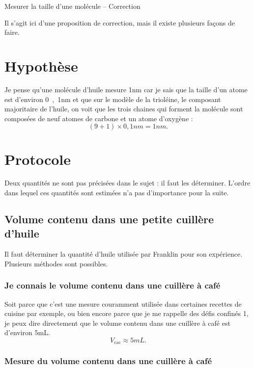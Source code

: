 \documentclass[12pt,a4paper]{article}
\begin{document}
\begin{header}
Mesurer la taille d'une molécule -- Correction
\end{header}

Il s'agit ici d'une proposition de correction, mais il existe plusieurs façons de faire.

\section{Hypothèse}

Je pense qu'une molécule d'huile mesure \unit{1}{nm} car je sais que la taille d'un atome est d'environ \unit{0{,}1}{nm} et que sur le modèle de la trioléine, le composant majoritaire de l'huile, on voit que les trois chaines qui forment la molécule sont composées de neuf atomes de carbone et un atome d'oxygène :
\[
(9+1) \times \unit{0{,}1}{nm} = \unit{1}{nm}.
\]

\section{Protocole}

Deux quantités ne sont pas précisées dans le sujet : il faut les déterminer.
L'ordre dans lequel ces quantités sont estimées n'a pas d'importance pour la suite.

\subsection{Volume contenu dans une petite cuillère d'huile}

Il faut déterminer la quantité d'huile utilisée par Franklin pour son expérience.
Plusieurs méthodes sont possibles.

\subsubsection{Je connais le volume contenu dans une cuillère à café}

Soit parce que c'est une mesure couramment utilisée dans certaines recettes de cuisine par exemple, ou bien encore parce que je me rappelle des défis confinés 1, je peux dire directement que le volume contenu dans une cuillère à café est d'environ \unit{5}{mL}.
\[
V_\mathrm{cac} \approx  \unit{5}{mL}.
\]

\subsubsection{Mesure du volume contenu dans une cuillère à café}
\end{document}
